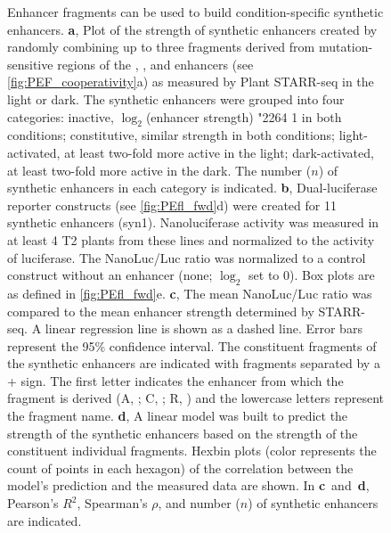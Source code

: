 \documentclass[10pt]{article}
\newcommand{\fignormal}{\footnotesize}
\renewcommand{\textle}{\char"2264{}}
\newcommand{\light}{light}
\newcommand{\dark}{dark}
\newif\ifnpc
\newcounter{fig}
\newenvironment{fig}{%
	\begin{figure}[p]%
		\stepcounter{fig}%
		\pdfbookmark{\figurename\ \thefig}{figure\thefig}
		\tikzsetnextfilename{figure\thefig}%
		\fignormal%
		\centering%
		\fontspec[BoldFont=Arial,BoldItalicFont=Ariali]{Arial}%
}{%
	\end{figure}%
	\clearpage%
	\ifnpc%
		\makenextpagecaption%
		\global\npcfalse%
	\fi%
}
\newif\ifsupp
\newcommand{\titleend}{. }
\newcommand{\nextentry}{ }
\newcommand{\captiontitle}[2][]{#2\titleend #1}
\newif\ifsubfigupper
\newcounter{subfig}[figure]
\newcommand{\subfigrefsep}{,}
\newcommand{\subfigrefand}{~and~}
\newcommand{\subfigunformatted}[1]{\ifsubfigupper\uppercase{#1}\else\lowercase{#1}\fi}
\newcommand{\plainsubfigref}[1]{\textbf{\subfigunformatted{#1}}}
\newcommand{\subfig}[1]{\plainsubfigref{#1}\subfigrefsep}
\begin{document}
		\begin{fig}
			\caption{%
				\captiontitle{Enhancer fragments can be used to build condition-specific synthetic enhancers}%
				\subfig{A} Plot of the strength of synthetic enhancers created by randomly combining up to three fragments derived from mutation-sensitive regions of the , , and  enhancers (see \cref{fig:PEF_cooperativity}\subfigunformatted{A}) as measured by Plant STARR-seq in the \light{} or \dark. The synthetic enhancers were grouped into four categories: inactive, $\log_2$(enhancer strength) \textle{} 1 in both conditions; constitutive, similar strength in both conditions;  light-activated, at least two-fold more active in the light; dark-activated, at least two-fold more active in the dark. The number ($n$) of synthetic enhancers in each category is indicated.\nextentry
				\subfig{B} Dual-luciferase reporter constructs (see \cref{fig:PEfl_fwd}\subfigunformatted{D}) were created for 11 synthetic enhancers (syn1). Nanoluciferase activity was measured in at least 4 T2 plants from these lines and normalized to the activity of luciferase. The NanoLuc/Luc ratio was normalized to a control construct without an enhancer (none; $\log_2$ set to 0). Box plots are as defined in \cref{fig:PEfl_fwd}\subfigunformatted{E}.
				\subfig{C} The mean NanoLuc/Luc ratio was compared to the mean enhancer strength determined by STARR-seq. A linear regression line is shown as a dashed line. Error bars represent the 95\% confidence interval. The constituent fragments of the synthetic enhancers are indicated with fragments separated by a + sign. The first letter indicates the  enhancer from which the fragment is derived (A, ; C, ; R, ) and the lowercase letters represent the fragment name.\nextentry
				\subfig{D} A linear model was built to predict the strength of the synthetic enhancers based on the strength of the constituent individual fragments. Hexbin plots (color represents the count of points in each hexagon) of the correlation between the model's prediction and the measured data are shown.\nextentry
				In \plainsubfigref{C}\subfigrefand\plainsubfigref{D}, Pearson's $R^2$, Spearman's $\rho$, and number ($n$) of synthetic enhancers are indicated.
			}%
			\label{fig:PEF_model}
		\end{fig}

	
	\fi
	
	\ifsupp
		
\end{document}

